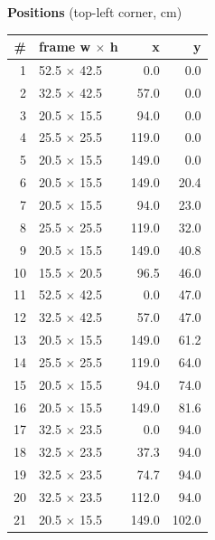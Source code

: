 \documentclass[a4paper,landscape,10pt]{article}
\begin{document}
\begin{minipage}[t]{0.25\textwidth}
\vspace{8pt}
{\bfseries Positions} (top-left corner, cm)\\[2pt]
\tiny
\begin{tabular}{@{}r l r r@{}}
\toprule
\# & frame w $\times$ h & x & y \\
\midrule
1 & 52.5 $\times$ 42.5 & 0.0 & 0.0 \\
2 & 32.5 $\times$ 42.5 & 57.0 & 0.0 \\
3 & 20.5 $\times$ 15.5 & 94.0 & 0.0 \\
4 & 25.5 $\times$ 25.5 & 119.0 & 0.0 \\
5 & 20.5 $\times$ 15.5 & 149.0 & 0.0 \\
6 & 20.5 $\times$ 15.5 & 149.0 & 20.4 \\
7 & 20.5 $\times$ 15.5 & 94.0 & 23.0 \\
8 & 25.5 $\times$ 25.5 & 119.0 & 32.0 \\
9 & 20.5 $\times$ 15.5 & 149.0 & 40.8 \\
10 & 15.5 $\times$ 20.5 & 96.5 & 46.0 \\
11 & 52.5 $\times$ 42.5 & 0.0 & 47.0 \\
12 & 32.5 $\times$ 42.5 & 57.0 & 47.0 \\
13 & 20.5 $\times$ 15.5 & 149.0 & 61.2 \\
14 & 25.5 $\times$ 25.5 & 119.0 & 64.0 \\
15 & 20.5 $\times$ 15.5 & 94.0 & 74.0 \\
16 & 20.5 $\times$ 15.5 & 149.0 & 81.6 \\
17 & 32.5 $\times$ 23.5 & 0.0 & 94.0 \\
18 & 32.5 $\times$ 23.5 & 37.3 & 94.0 \\
19 & 32.5 $\times$ 23.5 & 74.7 & 94.0 \\
20 & 32.5 $\times$ 23.5 & 112.0 & 94.0 \\
21 & 20.5 $\times$ 15.5 & 149.0 & 102.0 \\
\bottomrule
\end{tabular}
\end{minipage}
\clearpage
\end{document}
